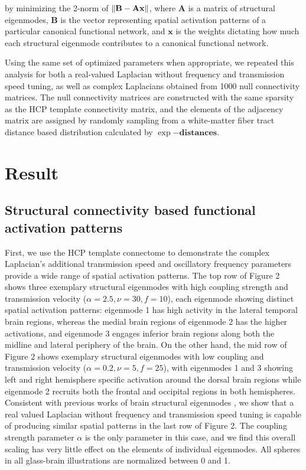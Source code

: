 \documentclass{article}
\begin{document}
by minimizing the 2-norm of $\mathbf{\norm{B-Ax}}$, where $\mathbf{A}$ is a matrix of structural eigenmodes, $\mathbf{B}$ is the vector representing spatial activation patterns of a particular canonical functional network, and $\mathbf{x}$ is the weights dictating how much each structural eigenmode contributes to a canonical functional network. 

Using the same set of optimized parameters when appropriate, we repeated this analysis for both a real-valued Laplacian without frequency and transmission speed tuning, as well as complex Laplacians obtained from 1000 null connectivity matrices. The null connectivity matrices are constructed with the same sparsity as the HCP template connectivity matrix, and the elements of the adjacency matrix are assigned by randomly sampling from a white-matter fiber tract distance based distribution calculated by $\exp{-\mathbf{distances}}$. 

\section{Result}

\subsection{Structural connectivity based functional activation patterns}
First, we use the HCP template connectome to demonstrate the complex Laplacian's additional transmission speed and oscillatory frequency parameters provide a wide range of spatial activation patterns. The top row of Figure 2 shows three exemplary structural eigenmodes with high coupling strength and transmission velocity ($\alpha = 2.5, \nu = 30, f = 10$), each eigenmode showing distinct spatial activation patterns: eigenmode 1 has high activity in the lateral temporal brain regions, whereas the medial brain regions of eigenmode 2 has the higher activations, and eigenmode 3 engages inferior brain regions along both the midline and lateral periphery of the brain. On the other hand, the mid row of Figure 2 shows exemplary structural eigenmodes with low coupling and transmission velocity ($\alpha = 0.2, \nu = 5, f = 25$), with eigenmodes 1 and 3 showing left and right hemisphere specific activation around the dorsal brain regions while eigenmode 2 recruits both the frontal and occipital regions in both hemispheres. Consistent with previous works of brain structural eigenmodes \cite{Atasoy2016}, we show that a real valued Laplacian without frequency and transmission speed tuning is capable of producing similar spatial patterns in the last row of Figure 2. The coupling strength parameter $\alpha$ is the only parameter in this case, and we find this overall scaling has very little effect on the elements of individual eigenmodes. All spheres in all glass-brain illustrations are normalized between 0 and 1. 
\end{document}
